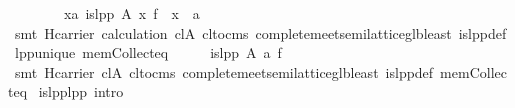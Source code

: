 \begin{isabellebody}
\ \ \isamarkupfalse%
\isanewline
\ \ \isamarkupfalse%
\ \isamarkupfalse%
\ {}{}x{}{}a{}\ is{}lpp\ A\ x\ f\ {}\ x\ {}\ {}a{}\isanewline
\ \ \ \ \isamarkupfalse%
\ {}smt\ H{}carrier\ calculation\ cl{}A\ cl{}to{}cms\ complete{}meet{}semilattice{}glb{}least\ is{}lpp{}def\ lpp{}unique\ mem{}Collect{}eq{}\isanewline
\ \ \isamarkupfalse%
\ \isamarkupfalse%
\ {}is{}lpp\ A\ {}a\ f{}\isanewline
\ \ \ \ \isamarkupfalse%
\ {}smt\ H{}carrier\ cl{}A\ cl{}to{}cms\ complete{}meet{}semilattice{}glb{}least\ is{}lpp{}def\ mem{}Collect{}eq{}\isanewline
{}\isamarkupfalse%
%
\endisatagproof
{\isafoldproof}%
%
\isadelimproof
\isanewline
%
\endisadelimproof
\isanewline
{}\isamarkupfalse%
\ is{}lpp{}lpp\ {}intro{}{}{}\isanewline

\end{isabellebody}
